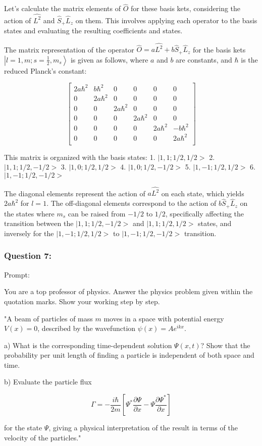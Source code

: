 \documentclass[a4paper,11pt]{article}
\begin{document}
Let's calculate the matrix elements of \(\hat{O}\) for these basis kets, considering the action of \(\hat{L^2}\) and \(\hat{S}_{+}\hat{L}_{z}\) on them. This involves applying each operator to the basis states and evaluating the resulting coefficients and states.

The matrix representation of the operator \(\hat{O} = a\hat{L^{2}} + b\hat{S}_{+}\hat{L}_{z}\) for the basis kets \(\left|l=1, m; s=\frac{1}{2}, m_{s} \right>\) is given as follows, where \(a\) and \(b\) are constants, and \(\hbar\) is the reduced Planck's constant:

\[
\begin{bmatrix}
2a\hbar^2 & b\hbar^2 & 0 & 0 & 0 & 0 \\
0 & 2a\hbar^2 & 0 & 0 & 0 & 0 \\
0 & 0 & 2a\hbar^2 & 0 & 0 & 0 \\
0 & 0 & 0 & 2a\hbar^2 & 0 & 0 \\
0 & 0 & 0 & 0 & 2a\hbar^2 & -b\hbar^2 \\
0 & 0 & 0 & 0 & 0 & 2a\hbar^2 \\
\end{bmatrix}
\]

This matrix is organized with the basis states:
1. \(|1, 1; 1/2, 1/2>\)
2. \(|1, 1; 1/2, -1/2>\)
3. \(|1, 0; 1/2, 1/2>\)
4. \(|1, 0; 1/2, -1/2>\)
5. \(|1, -1; 1/2, 1/2>\)
6. \(|1, -1; 1/2, -1/2>\)

The diagonal elements represent the action of \(a\hat{L^{2}}\) on each state, which yields \(2a\hbar^2\) for \(l=1\). The off-diagonal elements correspond to the action of \(b\hat{S}_{+}\hat{L}_{z}\) on the states where \(m_s\) can be raised from \(-1/2\) to \(1/2\), specifically affecting the transition between the \(|1, 1; 1/2, -1/2>\) and \(|1, 1; 1/2, 1/2>\) states, and inversely for the \(|1, -1; 1/2, 1/2>\) to \(|1, -1; 1/2, -1/2>\) transition. 

\subsubsection*{Question 7:}

Prompt:
\begin{spverbatim}
    You are a top professor of physics. Answer the physics problem given within the quotation marks. Show your working step by step.

    "A beam of particles of mass \( m \) moves in a space with potential energy \( V(x) = 0 \), described by the wavefunction \( \psi(x) = Ae^{ikx} \).

    a) What is the corresponding time-dependent solution \( \Psi(x,t) \)? Show that the probability per unit length of finding a particle is independent of both space and time.

    b) Evaluate the particle flux 

    \[ \Gamma = -\frac{i\hbar}{2m}\left[ \Psi^{*}\frac{\partial\Psi}{\partial x} - \Psi\frac{\partial\Psi^{*}}{\partial x} \right] \]

    for the state \( \Psi \), giving a physical interpretation of the result in terms of the velocity of the particles."
\end{spverbatim}
\end{document}
